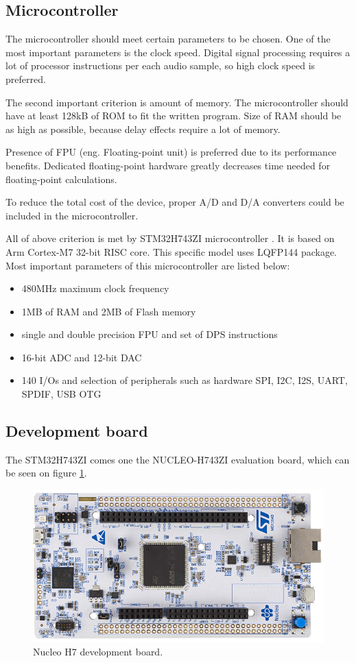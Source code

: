 \documentclass[a4paper,twoside,12pt]{book}
\begin{document}
\subsection {Microcontroller}
The microcontroller should meet certain parameters to be chosen.
One of the most important parameters is the clock speed.
Digital signal processing requires a lot of processor instructions
per each audio sample, so high clock speed is preferred.

The second important criterion is amount of memory.
The microcontroller should have at least 128kB of ROM
to fit the written program.
Size of RAM should be as high as possible,
because delay effects require a lot of memory.

Presence of FPU (eng. Floating-point unit) is preferred due to its performance benefits.
Dedicated floating-point hardware greatly decreases time
needed for floating-point calculations.

To reduce the total cost of the device,
proper A/D and D/A converters could be included in the microcontroller.

All of above criterion is met by STM32H743ZI microcontroller
\cite{ST:RM}.
It is based on Arm Cortex-M7 32-bit RISC core.
This specific model uses LQFP144 package.
Most important parameters of this microcontroller are listed below:
\begin{itemize}
    \item 480MHz maximum clock frequency
    \item 1MB of RAM and 2MB of Flash memory
    \item single and double precision FPU and set of DPS instructions
    \item 16-bit ADC and 12-bit DAC
    \item 140 I/Os and selection of peripherals such as hardware
    SPI, I2C, I2S, UART, SPDIF, USB OTG
\end{itemize}

\subsection{Development board}
The STM32H743ZI comes one the NUCLEO-H743ZI evaluation board,
which can be seen on figure \ref{fig:Nucleo}.

\begin{figure}[H]
    \centering
    \includegraphics[width=\textwidth]{images/Nucleo}
    \caption{Nucleo H7 development board\cite{ST:UM2407}.}
    \label{fig:Nucleo}
\end{figure}
\end{document}
